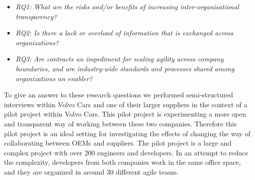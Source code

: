 \begin{itemize}
\item {\em RQ1: What are the risks and/or benefits of increasing inter-organisational transparency?}
\item {\em RQ2: Is there a lack or overload of information that is exchanged across organizations?} 
\item {\em RQ3: Are contracts an impediment for scaling agility across company boundaries, and 
are industry-wide standards and processes shared among organizations an enabler?} 
\end{itemize}

To give an answer to these research questions we performed semi-structured interviews within Volvo Cars and 
one of their larger suppliers in the context of a pilot project within Volvo Cars. This pilot project is experimenting a more open and transparent way of working between these two companies. Therefore this pilot project is an ideal setting for investigating the effects of changing the way of collaborating between OEMs and suppliers.  
The pilot project is a large and complex project with over 200 engineers and developers. 
In an attempt to reduce the complexity, developers from both companies work in the same office space, and they are organized in around 30 different agile teams. %

